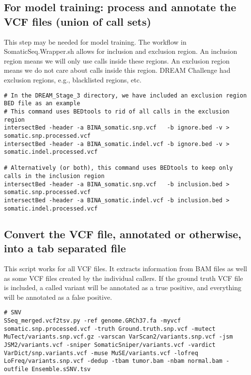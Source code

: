 \documentclass[10pt,letterpaper]{article}
\begin{document}
\begin{sloppypar}
\begin{enumerate}
\end{enumerate}





\subsection{For model training: process and annotate the VCF files (union of call sets)}

This step may be needed for model training. The workflow in SomaticSeq.Wrapper.sh allows for inclusion and exclusion region. An inclusion region means we will only use calls inside these regions. An exclusion region means we do not care about calls inside this region. DREAM Challenge had exclusion regions, e.g., blacklisted regions, etc. 
	
\begin{lstlisting}
# In the DREAM_Stage_3 directory, we have included an exclusion region BED file as an example
# This command uses BEDtools to rid of all calls in the exclusion region
intersectBed -header -a BINA_somatic.snp.vcf   -b ignore.bed -v > somatic.snp.processed.vcf
intersectBed -header -a BINA_somatic.indel.vcf -b ignore.bed -v > somatic.indel.processed.vcf

# Alternatively (or both), this command uses BEDtools to keep only calls in the inclusion region
intersectBed -header -a BINA_somatic.snp.vcf   -b inclusion.bed > somatic.snp.processed.vcf
intersectBed -header -a BINA_somatic.indel.vcf -b inclusion.bed > somatic.indel.processed.vcf

\end{lstlisting}



\subsection{Convert the VCF file, annotated or otherwise, into a tab separated file}
This script works for all VCF files. It extracts information from BAM files as well as some VCF files created by the individual callers. If the ground truth VCF file is included, a called variant will be annotated as a true positive, and everything will be annotated as a false positive.

	
\begin{lstlisting}
# SNV
SSeq_merged.vcf2tsv.py -ref genome.GRCh37.fa -myvcf somatic.snp.processed.vcf -truth Ground.truth.snp.vcf -mutect MuTect/variants.snp.vcf.gz -varscan VarScan2/variants.snp.vcf -jsm JSM2/variants.vcf -sniper SomaticSniper/variants.vcf -vardict VarDict/snp.variants.vcf -muse MuSE/variants.vcf -lofreq LoFreq/variants.snp.vcf -dedup -tbam tumor.bam -nbam normal.bam -outfile Ensemble.sSNV.tsv
\end{lstlisting}



\end{sloppypar}
\end{document}
